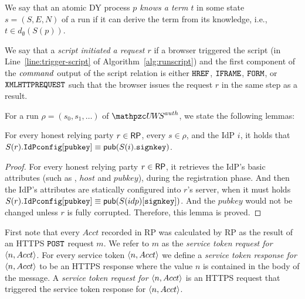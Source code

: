 \begin{theorem}
\begin{definition}\label{def:knowing}
  We say that an atomic DY process \emph{$p$ knows a term $t$} in some
  state $s=(S,E,N)$ of a run if it can derive the term from its
  knowledge, i.e., $t \in d_{\emptyset}(S(p))$.
\end{definition}


\begin{definition}\label{def:initiating}
  We say that a \emph{script initiated a request $r$} if a browser
  triggered the script (in Line~\ref{line:trigger-script} of
  Algorithm~\ref{alg:runscript}) and the first component of the
  $\mathit{command}$ output of the script relation is either $\mathtt{HREF}$, 
  $\mathtt{IFRAME}$, $\mathtt{FORM}$, or $\mathtt{XMLHTTPREQUEST}$ such that the browser
  issues the request $r$ in the same step as a result.
\end{definition}
  
  For a run $\rho = (s_0, s_1,\dots)$ of $\uppressoauthwebsystem$, we state the following lemmas:
 
 \begin{lemma}\label{lemma:rp-correct-idppubkey}
 For every honest relying party $r \in \mathsf{RP}$, every $s \in \rho$, and the IdP $i$, it holds that $S(r).\mathtt{IdPconfig}[\mathtt{pubkey}] \equiv \mathsf{pub}(S(i).\mathtt{signkey})$.
 \end{lemma}
 
 \begin{proof}
 For every honest relying party $r \in \mathsf{RP}$, it retrieves the IdP's basic attributes (such as , $host$ and $pubkey$), during the registration phase. And then the IdP's attributes are statically configured into $r$'s server, when it must holds $S(r).\mathtt{IdPconfig}[\mathtt{pubkey}] \equiv \mathsf{pub}(S(idp)[\mathtt{signkey}])$. And the $pubkey$ would not be changed unless $r$ is fully corrupted. Therefore, this lemma is proved.
 \end{proof}
  
 \begin{definition}
  First note that every $Acct$ recorded in RP was calculated by RP as the result of an HTTPS $\mathtt{POST}$ request $m$. We refer to $m$ as the   \emph{service token request for $\langle n, Acct\rangle$}. For every service token $\langle n,Acct\rangle$ we define a \emph{service token response for $\langle n,Acct\rangle$} to be an HTTPS response where the value $n$ is contained in the body of the message. A \emph{service token request for $\langle n,Acct\rangle$} is an HTTPS request that triggered the service token response for $\langle n,Acct\rangle$.
\end{definition}
  

\end{theorem}
